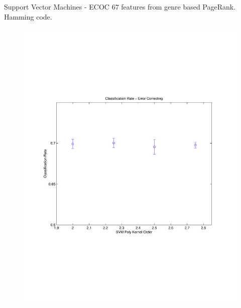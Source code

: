 \documentclass[xcolor=dvipsnames,t]{beamer} %
\begin{document}
\begin{frame}{Support Vector Machines - ECOC}
   $67$ features from genre based PageRank.  Hamming code.
   ~\\[-9em]
   \begin{figure}
      \centering
      \includegraphics[width=\textwidth]{figures/optimSVMECOCOrder_Dale.pdf}
   \end{figure}
\end{frame}
\end{document}
